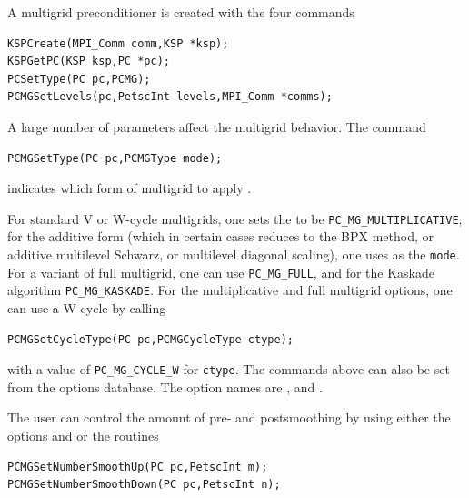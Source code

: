 A multigrid preconditioner is created with the four commands
\begin{lstlisting}
KSPCreate(MPI_Comm comm,KSP *ksp);
KSPGetPC(KSP ksp,PC *pc);
PCSetType(PC pc,PCMG);
PCMGSetLevels(pc,PetscInt levels,MPI_Comm *comms);
\end{lstlisting}
A large number of parameters affect the multigrid behavior. The command
\begin{lstlisting}
PCMGSetType(PC pc,PCMGType mode);
\end{lstlisting}
indicates which form of multigrid to apply \cite{1sbg}.
  

For standard V or W-cycle multigrids, one sets the  to be  \lstinline{PC_MG_MULTIPLICATIVE}; for the
additive form (which in certain cases reduces to the BPX method, or additive
multilevel Schwarz, or multilevel diagonal scaling), one uses
  as the \lstinline{mode}.  For a variant
of full multigrid, one can
 use  \lstinline{PC_MG_FULL}, and for the Kaskade
algorithm  \lstinline{PC_MG_KASKADE}.
For the multiplicative and full multigrid options, one can use a
W-cycle by   calling
\begin{lstlisting}
PCMGSetCycleType(PC pc,PCMGCycleType ctype);
\end{lstlisting}
with a value of \lstinline{PC_MG_CYCLE_W} for \lstinline{ctype}.
The commands above can also be set from the options database. The option
names are ,
and  .  

The user can control the amount of pre- and postsmoothing
  by using
either the options  
  and   or
the routines
\begin{lstlisting}
PCMGSetNumberSmoothUp(PC pc,PetscInt m);
PCMGSetNumberSmoothDown(PC pc,PetscInt n);
\end{lstlisting}

